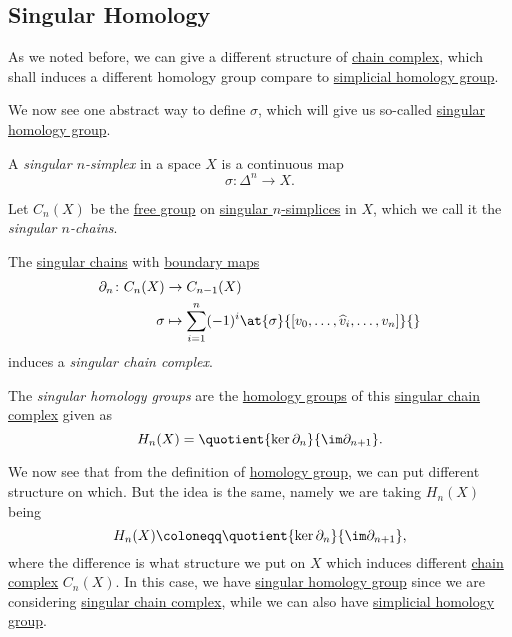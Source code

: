 \subsection{Singular Homology}
As we noted before, we can give a different structure of \hyperref[def:chain-complex]{chain complex}, which shall
induces a different homology group compare to \hyperref[def:simplicial-homology-group]{simplicial homology group}.

We now see one abstract way to define \(\sigma \), which will give us so-called \hyperref[def:singular-homology-group]{singular homology group}.

\begin{definition}\label{def:singular-simplex}
	A \emph{singular \(n\)-simplex} in a space \(X\) is a continuous map
	\[
		\sigma \colon \Delta^n \to X.
	\]
\end{definition}

\begin{definition}\label{def:singular-chain}
	Let \(C_n(X)\) be the \hyperref[def:free-group]{free group} on \hyperref[def:singular-simplex]{singular \(n\)-simplices} in \(X\), which we
	call it the \emph{singular \(n\)-chains}.
\end{definition}

\begin{definition}\label{def:singular-chain-complex}
	The \hyperref[def:singular-simplex]{singular chains} with \hyperref[def:boundary-homomorphism]{boundary maps}
	\[
		\begin{split}
			\partial_n \colon C_n(X) & \to C_{n - 1}(X)                                                                       \\
			\sigma              & \mapsto \sum_{i = 1}^n (-1)^i \at{\sigma}{[v_0, \ldots, \widehat{v}_i, \ldots, v_n]}{}
		\end{split}
	\]
	induces a \emph{singular chain complex}.
\end{definition}

\begin{definition}\label{def:singular-homology-group}
	The \emph{singular homology groups} are the \hyperref[def:homology-group]{homology groups} of this \hyperref[def:singular-chain]{singular chain complex} given as
	\[
		H_n(X) = \quotient{\ker \partial_n}{\im \partial_{n + 1}}.
	\]
\end{definition}
\begin{remark}
	We now see that from the definition of \hyperref[def:homology-group]{homology group}, we can put different structure on which.
	But the idea is the same, namely we are taking \(H_{n} (X)\) being
	\[
		H_n(X) \coloneqq \quotient{\ker \partial _n}{\im \partial _{n+1}},
	\]
	where the difference is what structure we put on \(X\) which induces different \hyperref[def:chain-complex]{chain complex} \(C_{n} (X)\).
	In this case, we have \hyperref[def:singular-homology-group]{singular homology group} since we are considering
	\hyperref[def:singular-chain-complex]{singular chain complex}, while we can also have
	\hyperref[def:simplicial-homology-group]{simplicial homology group}.
\end{remark}

